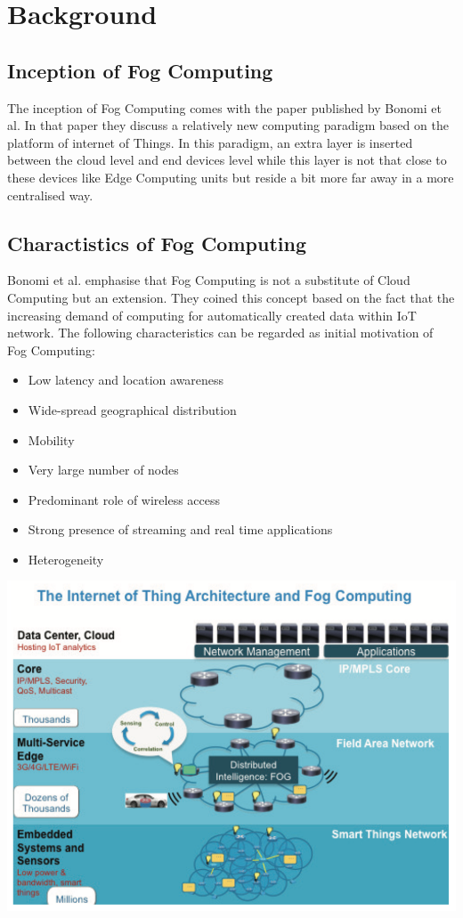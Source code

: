 \chapter{Background} \label{chap:background}

\section{Inception of Fog Computing}
The inception of Fog Computing comes with the paper published by Bonomi et al. In that paper they discuss a relatively new computing paradigm based on the platform of internet of Things. In this paradigm, an extra layer is inserted between the cloud level and end devices level while this layer is not that close to these devices like Edge Computing units but reside a bit more far away in a more centralised way.  \cite{roman2018mobile} 

\section{Charactistics of Fog Computing}
Bonomi et al. emphasise that Fog Computing is not a substitute of Cloud Computing but an extension. They coined this concept based on the fact that the increasing demand of computing for automatically created data within IoT network. The following characteristics can be regarded as initial motivation of Fog Computing\cite{bonomi2012fog}:
\begin{itemize}
    \item Low latency and location awareness
    \item Wide-spread geographical distribution
    \item Mobility
    \item Very large number of nodes
    \item Predominant role of wireless access
    \item Strong presence of streaming and real time applications
    \item Heterogeneity
\end{itemize}

\includegraphics[width=\textwidth]{images/the_internet_of_thing_architecture_and_fog_computing.png}

